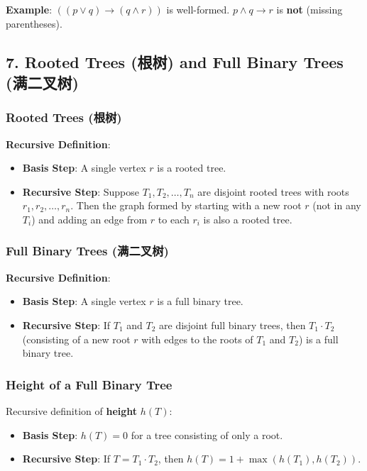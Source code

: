 \documentclass[10pt,a4paper,openany]{ctexbook}
\theoremstyle{definition}
\theoremstyle{remark}
\begin{document}
\textbf{Example}: $((p \lor q) \to (q \land r))$ is well-formed. $p \land q \to r$ is \textbf{not} (missing parentheses).
\vspace{-2pt}

\subsection{7. Rooted Trees (根树) and Full Binary Trees (满二叉树)}

\subsubsection{Rooted Trees (根树)}

\textbf{Recursive Definition}:
\begin{itemize}
\item \textbf{Basis Step}: A single vertex $r$ is a rooted tree.
\item \textbf{Recursive Step}: Suppose $T_1, T_2, \dots, T_n$ are disjoint rooted trees with roots $r_1, r_2, \dots, r_n$. Then the graph formed by starting with a new root $r$ (not in any $T_i$) and adding an edge from $r$ to each $r_i$ is also a rooted tree.

\end{itemize}

\subsubsection{Full Binary Trees (满二叉树)}

\textbf{Recursive Definition}:
\begin{itemize}
\item \textbf{Basis Step}: A single vertex $r$ is a full binary tree.
\item \textbf{Recursive Step}: If $T_1$ and $T_2$ are disjoint full binary trees, then $T_1 \cdot T_2$ (consisting of a new root $r$ with edges to the roots of $T_1$ and $T_2$) is a full binary tree.

\end{itemize}

\subsubsection{Height of a Full Binary Tree}

Recursive definition of \textbf{height} $h(T)$:
\begin{itemize}
\item \textbf{Basis Step}: $h(T) = 0$ for a tree consisting of only a root.
\item \textbf{Recursive Step}: If $T = T_1 \cdot T_2$, then $h(T) = 1 + \max(h(T_1), h(T_2))$.

\end{itemize}
\end{document}
